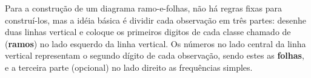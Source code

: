 


\newpage
Para a construção de um diagrama ramo-e-folhas, não há regras fixas para construí-los, mas a idéia básica é dividir cada observação em três partes: desenhe duas linhas vertical e coloque os primeiros digitos de cada classe chamado de (\textbf{ramos}) no lado esquerdo da linha vertical. Os números no lado central da linha vertical representam o segundo dígito de cada observação, sendo estes as \textbf{folhas}, e a terceira parte (opcional) no lado direito as frequências 
 simples.\vskip0.3cm


